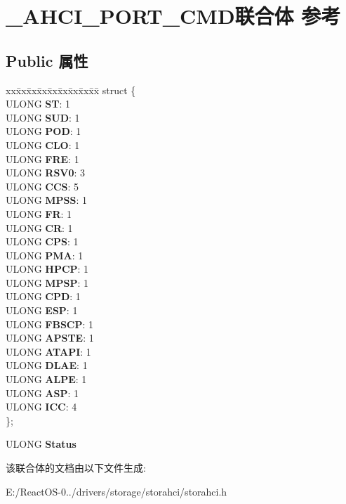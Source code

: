 \hypertarget{union___a_h_c_i___p_o_r_t___c_m_d}{}\section{\+\_\+\+A\+H\+C\+I\+\_\+\+P\+O\+R\+T\+\_\+\+C\+M\+D联合体 参考}
\label{union___a_h_c_i___p_o_r_t___c_m_d}
\subsection*{Public 属性}
\begin{DoxyCompactItemize}
\item 
\mbox{\label{union___a_h_c_i___p_o_r_t___c_m_d_a8be55e1484d4e1cc4e2095d6159bc621}} 
\begin{tabbing}
xx\=xx\=xx\=xx\=xx\=xx\=xx\=xx\=xx\=\kill
struct \{\\
\>ULONG {\bfseries ST}: 1\\
\>ULONG {\bfseries SUD}: 1\\
\>ULONG {\bfseries POD}: 1\\
\>ULONG {\bfseries CLO}: 1\\
\>ULONG {\bfseries FRE}: 1\\
\>ULONG {\bfseries RSV0}: 3\\
\>ULONG {\bfseries CCS}: 5\\
\>ULONG {\bfseries MPSS}: 1\\
\>ULONG {\bfseries FR}: 1\\
\>ULONG {\bfseries CR}: 1\\
\>ULONG {\bfseries CPS}: 1\\
\>ULONG {\bfseries PMA}: 1\\
\>ULONG {\bfseries HPCP}: 1\\
\>ULONG {\bfseries MPSP}: 1\\
\>ULONG {\bfseries CPD}: 1\\
\>ULONG {\bfseries ESP}: 1\\
\>ULONG {\bfseries FBSCP}: 1\\
\>ULONG {\bfseries APSTE}: 1\\
\>ULONG {\bfseries ATAPI}: 1\\
\>ULONG {\bfseries DLAE}: 1\\
\>ULONG {\bfseries ALPE}: 1\\
\>ULONG {\bfseries ASP}: 1\\
\>ULONG {\bfseries ICC}: 4\\
\}; \\

\end{tabbing}\item 
\mbox{\label{union___a_h_c_i___p_o_r_t___c_m_d_ac259334225ac1c658e391a649b5614d7}} 
U\+L\+O\+NG {\bfseries Status}
\end{DoxyCompactItemize}


该联合体的文档由以下文件生成\+:\begin{DoxyCompactItemize}
\item 
E\+:/\+React\+O\+S-\/0../drivers/storage/storahci/storahci.\+h\end{DoxyCompactItemize}
